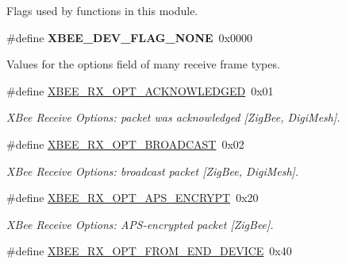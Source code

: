 \label{_amgrp01747264fe7bf50731df0522c351974e}%
Flags used by functions in this module. \begin{DoxyCompactItemize}
\item 
\hypertarget{group__xbee__device_ga77bd15823a544f1241a6733e74044785}{\#define {\bfseries X\-B\-E\-E\-\_\-\-D\-E\-V\-\_\-\-F\-L\-A\-G\-\_\-\-N\-O\-N\-E}~0x0000}\label{group__xbee__device_ga77bd15823a544f1241a6733e74044785}

\end{DoxyCompactItemize}
\label{_amgrp01747264fe7bf50731df0522c351974e}%
Values for the {\ttfamily options} field of many receive frame types. \begin{DoxyCompactItemize}
\item 
\hypertarget{group__xbee__device_gad401ef2f8d1d95e09d607bf3ee0fdb06}{\#define \hyperlink{group__xbee__device_gad401ef2f8d1d95e09d607bf3ee0fdb06}{X\-B\-E\-E\-\_\-\-R\-X\-\_\-\-O\-P\-T\-\_\-\-A\-C\-K\-N\-O\-W\-L\-E\-D\-G\-E\-D}~0x01}\label{group__xbee__device_gad401ef2f8d1d95e09d607bf3ee0fdb06}

\begin{DoxyCompactList}\small\item\em X\-Bee Receive Options\-: packet was acknowledged \mbox{[}Zig\-Bee, Digi\-Mesh\mbox{]}. \end{DoxyCompactList}\item 
\hypertarget{group__xbee__device_ga6f9c28f688c7f59b8df18f660fb94961}{\#define \hyperlink{group__xbee__device_ga6f9c28f688c7f59b8df18f660fb94961}{X\-B\-E\-E\-\_\-\-R\-X\-\_\-\-O\-P\-T\-\_\-\-B\-R\-O\-A\-D\-C\-A\-S\-T}~0x02}\label{group__xbee__device_ga6f9c28f688c7f59b8df18f660fb94961}

\begin{DoxyCompactList}\small\item\em X\-Bee Receive Options\-: broadcast packet \mbox{[}Zig\-Bee, Digi\-Mesh\mbox{]}. \end{DoxyCompactList}\item 
\hypertarget{group__xbee__device_gafcd6165b6fd733dea9704d79c5ecc671}{\#define \hyperlink{group__xbee__device_gafcd6165b6fd733dea9704d79c5ecc671}{X\-B\-E\-E\-\_\-\-R\-X\-\_\-\-O\-P\-T\-\_\-\-A\-P\-S\-\_\-\-E\-N\-C\-R\-Y\-P\-T}~0x20}\label{group__xbee__device_gafcd6165b6fd733dea9704d79c5ecc671}

\begin{DoxyCompactList}\small\item\em X\-Bee Receive Options\-: A\-P\-S-\/encrypted packet \mbox{[}Zig\-Bee\mbox{]}. \end{DoxyCompactList}\item 
\hypertarget{group__xbee__device_gaed8a550b168aa09686266454a2da2a2d}{\#define \hyperlink{group__xbee__device_gaed8a550b168aa09686266454a2da2a2d}{X\-B\-E\-E\-\_\-\-R\-X\-\_\-\-O\-P\-T\-\_\-\-F\-R\-O\-M\-\_\-\-E\-N\-D\-\_\-\-D\-E\-V\-I\-C\-E}~0x40}\label{group__xbee__device_gaed8a550b168aa09686266454a2da2a2d}


\end{DoxyCompactItemize}

